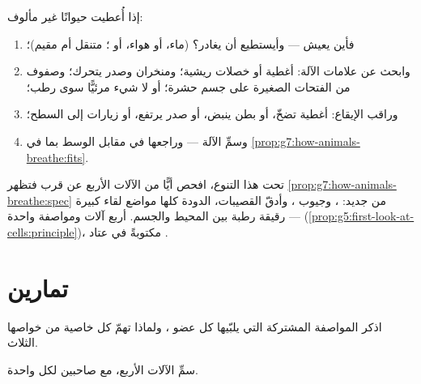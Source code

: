 \begin{method}\label{met:g7:how-animals-breathe:read}
إذا أُعطيت حيوانًا غير مألوف:
\begin{enumerate}
  \item فأين يعيش --- وأيستطيع أن يغادر؟ (ماء، أو هواء، أو ؛
        متنقل أم مقيم)؛
  \item وابحث عن علامات الآلة: أغطية  أو خصلات ريشية؛
        ومنخران وصدر يتحرك؛ وصفوف من الفتحات الصغيرة على جسم
        حشرة؛ أو لا شيء مرئيًّا سوى  رطب؛
  \item وراقب الإيقاع: أغطية تضخّ، أو بطن ينبض، أو صدر يرتفع، أو
        زيارات إلى السطح؛
  \item وسمِّ الآلة --- وراجعها في مقابل الوسط بما في
        \cref{prop:g7:how-animals-breathe:fits}.
\end{enumerate}
\end{method}

\begin{remark}\label{rem:g7:how-animals-breathe:same}
تحت هذا التنوع، افحص أيًّا من الآلات الأربع عن قرب فتظهر
\cref{prop:g7:how-animals-breathe:spec} من جديد:  ،
وجيوب ، وأدقّ  القصيبات،  الدودة كلها مواضع لقاء
كبيرة رقيقة رطبة بين المحيط والجسم. أربع آلات ومواصفة واحدة ---
(\cref{prop:g5:first-look-at-cells:principle})، مكتوبةً في عتاد
.
\end{remark}

\section{تمارين}

\begin{exercise}[$\star$]\label{exo:g7:how-animals-breathe:1}
اذكر المواصفة المشتركة التي يلبّيها كل عضو ، ولماذا تهمّ كل
خاصية من خواصها الثلاث.
\end{exercise}

\begin{exercise}[$\star$]\label{exo:g7:how-animals-breathe:2}
سمِّ الآلات الأربع، مع صاحبين لكل واحدة.
\end{exercise}

